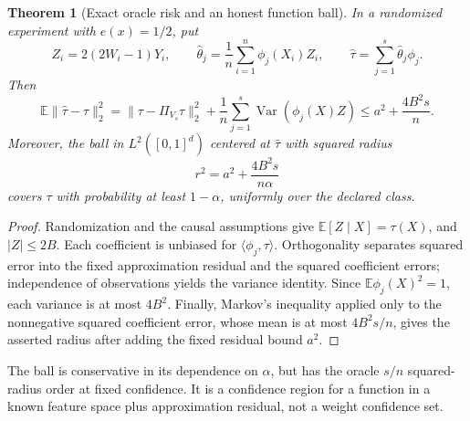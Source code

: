 \documentclass[11pt,a4paper]{article}
\newtheorem{theorem}{Theorem}
\newcommand{\E}{\mathbb E}
\newcommand{\Var}{\operatorname{Var}}
\begin{document}
\begin{theorem}[Exact oracle risk and an honest function ball]
In a randomized experiment with $e(x)=1/2$, put
\[
 Z_i=2(2W_i-1)Y_i,\qquad
 \widehat\theta_j=\frac1n\sum_{i=1}^n\phi_j(X_i)Z_i,\qquad
 \widehat\tau=\sum_{j=1}^s\widehat\theta_j\phi_j.
\]
Then
\[
 \E\|\widehat\tau-\tau\|_2^2
 =\|\tau-\Pi_{V_s}\tau\|_2^2+
       \frac1n\sum_{j=1}^s\Var(\phi_j(X)Z)
 \leq a^2+\frac{4B^2s}{n}.
\]
Moreover, the ball in $L^2([0,1]^d)$ centered at $\widehat\tau$ with squared radius
\[
 r^2=a^2+\frac{4B^2s}{n\alpha}
\]
covers $\tau$ with probability at least $1-\alpha$, uniformly over the declared class.
\end{theorem}
\begin{proof}
Randomization and the causal assumptions give $\E[Z\mid X]=\tau(X)$, and $|Z|\leq2B$. Each coefficient is unbiased for $\langle\phi_j,\tau\rangle$. Orthogonality separates squared error into the fixed approximation residual and the squared coefficient errors; independence of observations yields the variance identity. Since $\E\phi_j(X)^2=1$, each variance is at most $4B^2$. Finally, Markov's inequality applied only to the nonnegative squared coefficient error, whose mean is at most $4B^2s/n$, gives the asserted radius after adding the fixed residual bound $a^2$.
\end{proof}
The ball is conservative in its dependence on $\alpha$, but has the oracle $s/n$ squared-radius order at fixed confidence. It is a confidence region for a function in a known feature space plus approximation residual, not a weight confidence set.
\end{document}
